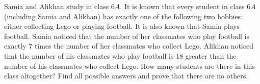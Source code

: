 Samia and Alikhan study in class $6A$. It is known that every student in class $6A$ (including Samia and Alikhan) has exactly one of the following two hobbies: either collecting Lego or playing football. It is also known that Samia plays football. Samia noticed that the number of her classmates who play football is exactly $7$ times the number of her classmates who collect Lego. Alikhan noticed that the number of his classmates who play football is $18$ greater than the number of his classmates who collect Lego. How many students are there in this class altogether? Find all possible answers and prove that there are no others.
